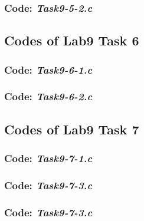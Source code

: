 \subsubsection*{Code: \textit{Task9-5-2.c}}

\newpage

\subsection*{Codes of Lab9 Task 6}
\subsubsection*{Code: \textit{Task9-6-1.c}}

\newpage

\subsubsection*{Code: \textit{Task9-6-2.c}}

\newpage

\subsection*{Codes of Lab9 Task 7}
\subsubsection*{Code: \textit{Task9-7-1.c}}

\newpage

\subsubsection*{Code: \textit{Task9-7-3.c}}

\newpage

\subsubsection*{Code: \textit{Task9-7-3.c}}

\newpage